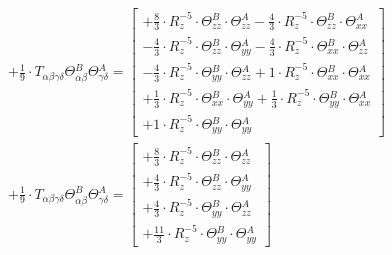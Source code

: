 \documentclass{article}
\begin{document}
\begin{subequations}\begin{gather}
+ \frac{1}{9} \cdot T_{\alpha{}\beta{}\gamma{}\delta{}} \Theta{}^{B}_{\alpha{}\beta{}} \Theta{}^{A}_{\gamma{}\delta{}} =  \left[ \begin{array}{c}
 		+ \frac{8}{3} \cdot R_{z}^{-5} \cdot \Theta{}^{B}_{zz} \cdot \Theta{}^{A}_{zz}- \frac{4}{3} \cdot R_{z}^{-5} \cdot \Theta{}^{B}_{zz} \cdot \Theta{}^{A}_{xx}
 \\[0.2em] 		 - \frac{4}{3} \cdot R_{z}^{-5} \cdot \Theta{}^{B}_{zz} \cdot \Theta{}^{A}_{yy}- \frac{4}{3} \cdot R_{z}^{-5} \cdot \Theta{}^{B}_{xx} \cdot \Theta{}^{A}_{zz}
 \\[0.2em] 		 - \frac{4}{3} \cdot R_{z}^{-5} \cdot \Theta{}^{B}_{yy} \cdot \Theta{}^{A}_{zz}+ 1 \cdot R_{z}^{-5} \cdot \Theta{}^{B}_{xx} \cdot \Theta{}^{A}_{xx}
 \\[0.2em] 		 + \frac{1}{3} \cdot R_{z}^{-5} \cdot \Theta{}^{B}_{xx} \cdot \Theta{}^{A}_{yy}+ \frac{1}{3} \cdot R_{z}^{-5} \cdot \Theta{}^{B}_{yy} \cdot \Theta{}^{A}_{xx}
 \\[0.2em] 		 + 1 \cdot R_{z}^{-5} \cdot \Theta{}^{B}_{yy} \cdot \Theta{}^{A}_{yy}
 \end{array}\right]  \\
+ \frac{1}{9} \cdot T_{\alpha{}\beta{}\gamma{}\delta{}} \Theta{}^{B}_{\alpha{}\beta{}} \Theta{}^{A}_{\gamma{}\delta{}} =  \left[ \begin{array}{c}
 		+ \frac{8}{3} \cdot R_{z}^{-5} \cdot \Theta{}^{B}_{zz} \cdot \Theta{}^{A}_{zz}
 \\[0.2em] 		 + \frac{4}{3} \cdot R_{z}^{-5} \cdot \Theta{}^{B}_{zz} \cdot \Theta{}^{A}_{yy}
 \\[0.2em] 		 + \frac{4}{3} \cdot R_{z}^{-5} \cdot \Theta{}^{B}_{yy} \cdot \Theta{}^{A}_{zz}
 \\[0.2em] 		 + \frac{11}{3} \cdot R_{z}^{-5} \cdot \Theta{}^{B}_{yy} \cdot \Theta{}^{A}_{yy}
 \end{array}\right]  \\
\end{gather}\end{subequations}


\begin{subequations}\begin{gather}
\end{gather}\end{subequations}
\end{document}
